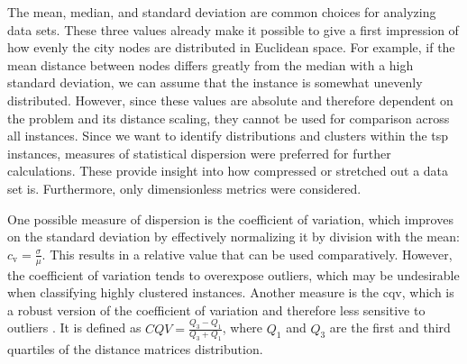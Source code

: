 The mean, median, and standard deviation are common choices for analyzing data sets. These three values  already make it possible to give a first impression of how evenly the city nodes are distributed in Euclidean space. For example, if the mean distance between nodes differs greatly from the median with a high standard deviation, we can assume that the instance is somewhat unevenly distributed. However, since these values are absolute and therefore dependent on the problem and its distance scaling, they cannot be used for comparison across all instances.
Since we want to identify distributions and clusters within the \gls{tsp} instances, measures of statistical dispersion were preferred for further calculations. These provide insight into how compressed or stretched out a data set is. Furthermore, only dimensionless metrics were considered.

One possible measure of dispersion is the coefficient of variation, which improves on the standard deviation by effectively normalizing it by division with the mean: $c_\text{v} = \frac{\sigma}{\mu}$. This results in a relative value that can be used comparatively. However, the coefficient of variation tends to overexpose outliers, which may be undesirable when classifying highly clustered instances.
Another measure is the \gls{cqv}, which is a robust version of the coefficient of variation and therefore less sensitive to outliers \cite{bonett2006confidence}. It is defined as $CQV = \frac{Q_3 - Q_1}{Q_3 + Q_1}$, where $Q_1$ and $Q_3$ are the first and third quartiles of the distance matrices distribution.


